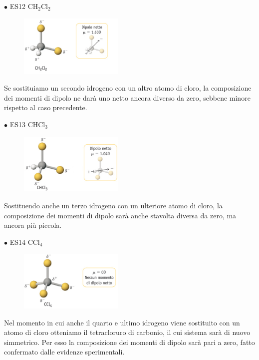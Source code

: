 \vspace{0.2cm}$\bullet$ ES12 CH$_2$Cl$_2$

\begin{figure}[htp]
    \centering
    \includegraphics[width=5cm]{immagini/CH_2Cl_2.png}
\end{figure}

\vspace{-0.2cm}Se sostituiamo un secondo idrogeno con un altro atomo di cloro, la composizione dei momenti di dipolo ne darà uno netto ancora diverso da zero, sebbene minore rispetto al caso precedente.

\vspace{0.2cm}$\bullet$ ES13 CHCl$_3$

\begin{figure}[htp]
    \centering
    \includegraphics[width=5cm]{immagini/CHCl_3.png}
\end{figure}

Sostituendo anche un terzo idrogeno con un ulteriore atomo di cloro, la composizione dei momenti di dipolo sarà anche stavolta diversa da zero, ma ancora più piccola.

\vspace{0.2cm}$\bullet$ ES14 CCl$_4$

\begin{figure}[htp]
    \centering
    \includegraphics[width=5cm]{immagini/CCl_4.png}
\end{figure}

Nel momento in cui anche il quarto e ultimo idrogeno viene sostituito con un atomo di cloro otteniamo il tetracloruro di carbonio, il cui sistema sarà di nuovo simmetrico. Per esso la composizione dei momenti di dipolo sarà pari a zero, fatto confermato dalle evidenze sperimentali.

